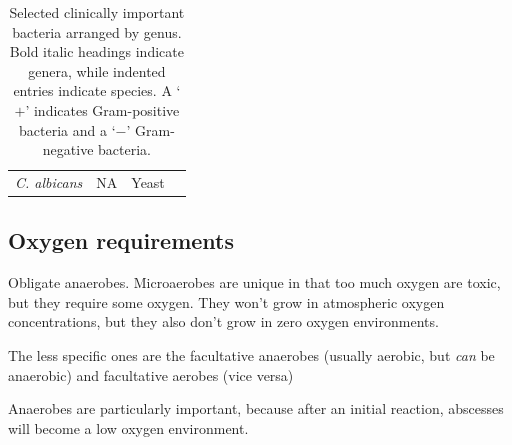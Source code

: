 \begin{table}[htbp]
\begin{tabularx}{\textwidth}{
    @{}
    >{\RaggedRight\arraybackslash}p{3.5cm}
    >{\Centering\arraybackslash}p{1.0cm}
    >{\RaggedRight\arraybackslash}p{2.2cm}
    >{\RaggedRight\arraybackslash}X
    @{}
}
     \addlinespace[3pt]
    \multicolumn{4}{@{}l}{\textbf{\textit{Candida}}} \\
    \cmidrule(lr){1-4}

    \hspace*{0.3cm}\textit{C. albicans} &
    NA &
    Yeast & \\

    \bottomrule
\end{tabularx}

\caption{Selected clinically important bacteria arranged by genus.
Bold italic headings indicate genera, while indented entries indicate
species. A `$ + $' indicates Gram-positive bacteria and a `$ - $'
Gram-negative bacteria. }
\label{tab:common-bacteria}

\end{table}

\subsection{Oxygen requirements}

Obligate anaerobes. Microaerobes are unique in that too much oxygen are toxic, but they require some oxygen. They won't grow in atmospheric oxygen concentrations, but they also don't grow in zero oxygen environments.

The less specific ones are the facultative anaerobes (usually aerobic, but \textit{can} be anaerobic) and facultative aerobes (vice versa)

Anaerobes are particularly important, because after an initial reaction, abscesses will become a low oxygen environment.


%
%
%


